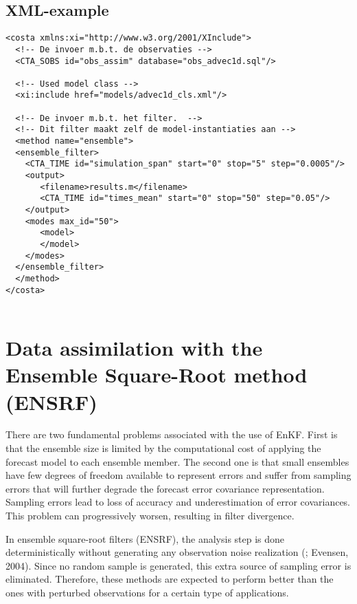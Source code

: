 \subsection{XML-example}
\begin{verbatim}
<costa xmlns:xi="http://www.w3.org/2001/XInclude">
  <!-- De invoer m.b.t. de observaties -->
  <CTA_SOBS id="obs_assim" database="obs_advec1d.sql"/>

  <!-- Used model class -->
  <xi:include href="models/advec1d_cls.xml"/>

  <!-- De invoer m.b.t. het filter.  -->
  <!-- Dit filter maakt zelf de model-instantiaties aan -->
  <method name="ensemble"> 
  <ensemble_filter>
    <CTA_TIME id="simulation_span" start="0" stop="5" step="0.0005"/>
    <output>
       <filename>results.m</filename>
       <CTA_TIME id="times_mean" start="0" stop="50" step="0.05"/>
    </output>
    <modes max_id="50">
       <model>
       </model>
    </modes>
  </ensemble_filter>
  </method> 
</costa>


\end{verbatim}


\section{Data assimilation  with the Ensemble Square-Root method (ENSRF)}

There are two fundamental problems associated with the use of EnKF. First is
that the ensemble size is limited by the computational cost of applying the
forecast model to each ensemble member. The second one is that small ensembles
have few degrees of freedom available to represent errors and suffer from
sampling errors that will further degrade the forecast error covariance
representation. Sampling errors lead to loss of accuracy and underestimation of
error covariances. This problem can progressively worsen, resulting in filter
divergence.

In ensemble square-root filters (ENSRF), the analysis step is done
deterministically without generating any observation noise realization
(\cite{Tippettetal2003}; Evensen, 2004). Since no random sample is generated,
this extra source of sampling error is eliminated. Therefore, these methods are
expected to perform better than the ones with perturbed observations for a
certain type of applications.

